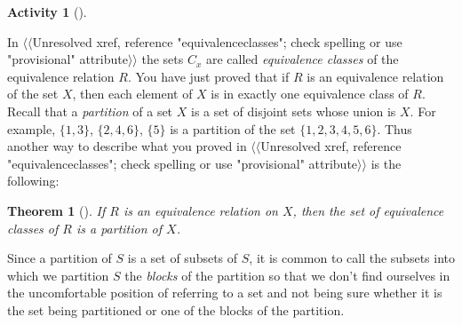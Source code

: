 \documentclass[10pt,]{book}
\theoremstyle{plain}
\newtheorem{theorem}{Theorem}[section]
\theoremstyle{definition}
\newtheorem{activity}[project]{Activity}
\numberwithin{equation}{chapter}
\begin{document}
\begin{activity}[]
\begin{enumerate}[label=(\alph*)]
\end{enumerate}
\end{activity}
In {$\langle\langle$Unresolved xref, reference "equivalenceclasses"; check spelling or use "provisional" attribute$\rangle\rangle$} the sets \(C_x\) are called \emph{equivalence classes} of the equivalence relation \(R\). You have just proved that if \(R\) is an equivalence relation of the set \(X\), then each element of \(X\) is in exactly one equivalence class of \(R\). Recall that a \emph{partition} of a set \(X\) is a set of disjoint sets whose union is \(X\). For example, \(\{1,3\}\), \(\{2,4,6\}\), \(\{5\}\) is a partition of the set \(\{1,2,3,4,5,6\}\). Thus another way to describe what you proved in {$\langle\langle$Unresolved xref, reference "equivalenceclasses"; check spelling or use "provisional" attribute$\rangle\rangle$} is the following:%
\begin{theorem}[{}]\label{theorem-9}
If \(R\) is an equivalence relation on \(X\), then the set of equivalence classes of \(R\) is a partition of \(X\).%
\end{theorem}
Since a partition of \(S\) is a set of subsets of \(S\), it is common to call the subsets into which we partition \(S\) the \emph{blocks} of the partition so that we don't find ourselves in the uncomfortable position of referring to a set and not being sure whether it is the set being partitioned or one of the blocks of the partition.%
\end{document}
